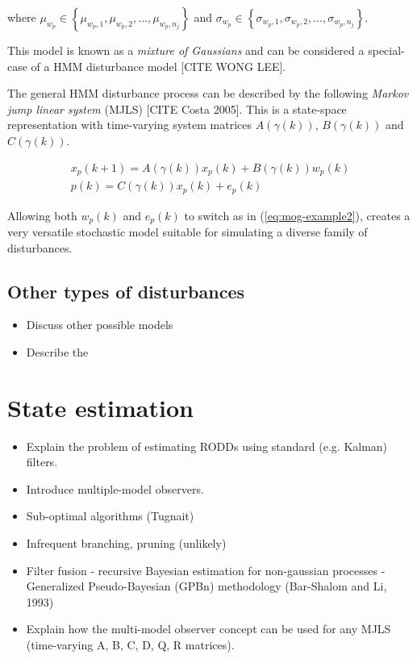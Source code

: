 where $\mu_{w_p}\in\left\{\mu_{w_p,1},\mu_{w_p,2},...,\mu_{w_p,n_j}\right\}$ and $\sigma_{w_p}\in\left\{\sigma_{w_p,1},\sigma_{w_p,2},...,\sigma_{w_p,n_j}\right\}$.

This model is known as a \textit{mixture of Gaussians} and can be considered a special-case of a HMM disturbance model [CITE WONG LEE].

The general HMM disturbance process can be described by the following \textit{Markov jump linear system} (MJLS) [CITE Costa 2005]. This is a state-space representation with time-varying system matrices $A(\gamma(k))$, $B(\gamma(k))$ and $C(\gamma(k))$.

\begin{equation} \label{eq:HMM}
	\begin{split}
	x_p(k+1)= A(\gamma(k))x_p(k)+B(\gamma(k))w_p(k) \\
	p(k)=C(\gamma(k))x_p(k) + e_p(k)
	\end{split}
\end{equation}

Allowing both $w_p(k)$ and $e_p(k)$ to switch as in (\ref{eq:mog-example2}), creates a very versatile stochastic model suitable for simulating a diverse family of disturbances.


\subsection{Other types of disturbances}

\begin{itemize}
	\item Discuss other possible models
	\item Describe the 
\end{itemize}



\section{State estimation}

\begin{itemize}
	\item Explain the problem of estimating RODDs using standard (e.g. Kalman) filters.
	\item Introduce multiple-model observers.
	\item Sub-optimal algorithms (Tugnait)
	\item Infrequent branching, pruning (unlikely)
	\item Filter fusion - recursive Bayesian estimation for non-gaussian processes - Generalized Pseudo-Bayesian (GPBn) methodology (Bar-Shalom and Li, 1993)
	\item Explain how the multi-model observer concept can be used for any MJLS (time-varying A, B, C, D, Q, R matrices).
\end{itemize}

